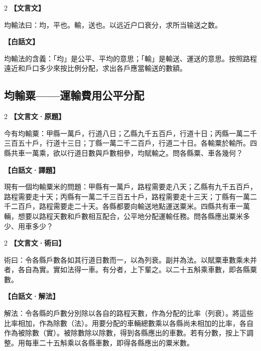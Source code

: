 \documentclass[11pt,a4paper]{article}
\newcommand{\zhc}{}[1]{{\CJKfamily{\CJKrmdefault}#1}}  %
\newcommand{\zhm}[1]{{\CJKfamily{\CJKrmdefault}#1}}  %
\newenvironment{prob bilingual}[1][]{%
  \begin{paracol}{2}%
  \setlength{\columnseprule}{0.4pt}%
}{%
  \end{paracol}%
  \medskip%
}
\begin{document}
\begin{paracol}{2}
\switchcolumn[0]
\noindent\textbf{\textcolor{notecolor}{\zhc{【文言文】}}}\par\smallskip
\zhc{
均輸法曰：均，平也。輸，送也。以远近户口衰分，求所当输送之数。
}

\switchcolumn[1]
\noindent\textbf{\textcolor{notecolor}{\zhm{【白話文】}}}\par\smallskip
\zhm{
均輸法的含義：「均」是公平、平均的意思；「輸」是輸送、運送的意思。按照路程遠近和戶口多少來按比例分配，求出各戶應當輸送的數額。
}
\end{paracol}

\medskip

\subsection{\zhc{均輸粟——運輸費用公平分配}}

\begin{paracol}{2}
\switchcolumn[0]
\noindent\textbf{\textcolor{notecolor}{\zhc{【文言文·原題】}}}\par\smallskip
\zhc{
今有均輸粟：甲縣一萬戶，行道八日；乙縣九千五百戶，行道十日；丙縣一萬二千三百五十戶，行道十三日；丁縣一萬二千二百戶，行道二十日。各輸粟於輸所。四縣共車一萬乘，欲以行道日數與戶數相參，均賦輸之。問各縣粟、車各幾何？
}

\switchcolumn[1]
\noindent\textbf{\textcolor{notecolor}{\zhm{【白話文·譯題】}}}\par\smallskip
\zhm{
現有一個均輸粟米的問題：甲縣有一萬戶，路程需要走八天；乙縣有九千五百戶，路程需要走十天；丙縣有一萬二千三百五十戶，路程需要走十三天；丁縣有一萬二千二百戶，路程需要走二十天。各縣都要向輸送地點運送粟米。四縣共有車一萬輛，想要以路程天數和戶數相互配合，公平地分配運輸任務。問各縣應出粟米多少、用車多少？
}
\end{paracol}

\medskip

\begin{paracol}{2}
\switchcolumn[0]
\noindent\textbf{\textcolor{notecolor}{\zhc{【文言文·術曰】}}}\par\smallskip
\zhc{
術曰：令各縣戶數各如其行道日數而一，以為列衰。副并為法。以賦粟車數乘未并者，各自為實。實如法得一車。有分者，上下輩之。以二十五斛乘車數，即各縣粟數。
}

\switchcolumn[1]
\noindent\textbf{\textcolor{notecolor}{\zhm{【白話文·解法】}}}\par\smallskip
\zhm{
解法：令各縣的戶數分別除以各自的路程天數，作為分配的比率（列衰）。將這些比率相加，作為除數（法）。用要分配的車輛總數乘以各縣尚未相加的比率，各自作為被除數（實）。被除數除以除數，得到各縣應出的車數。若有分數，按上下調整。用每車二十五斛乘以各縣車數，即得各縣應出的粟米數。
}
\end{paracol}
\end{document}
